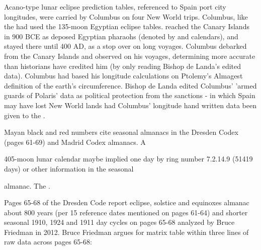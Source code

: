 \documentclass[12pt]{article}
\begin{document}
Acano-type lunar eclipse prediction tables, referenced to Spain port city longitudes, were carried by Columbus on four New World trips. Columbus, like the 
 had used the 135-moon Egyptian eclipse tables.   reached the Canary Islands in 900 BCE as deposed Egyptian pharaohs (denoted by 
 and calendars), and stayed there until 400 AD, as a stop over on long voyages. Columbus debarked from the Canary Islands and observed  on his voyages, determining  more accurate than historians have credited him (by only reading Bishop de Landa's edited data). Columbus had based his longitude calculations on Ptolemy's Almagest definition of the earth's circumference. Bishop de Landa edited Columbus' 'armed guards of Polaris' data as political protection from the  sanctions - in which Spain may have lost New World lands had Columbus' longitude hand written data been given to the .

Mayan black and red numbers cite seasonal almanacs in the Dresden Codex (pages 61-69) and Madrid Codex almanacs. A  

405-moon lunar calendar maybe implied one day by ring number 7.2.14.9 (51419 days) or other information in the seasonal

almanac. The .

Pages 65-68 of the Dresden Code report eclipse, solstice and equinoxes almanac about 800 years (per 15 reference dates mentioned on pages 61-64) and shorter seasonal 1910, 1924 and 1911 day cycles on pages 65-68 analyzed by Bruce Friedman in 2012. Bruce Friedman argues for matrix table within three lines of raw data across pages 65-68:
\end{document}
